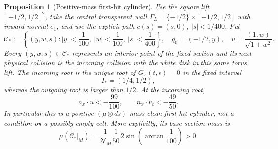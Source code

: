 \documentclass[11pt]{article}
\newtheorem{proposition}[theorem]{Proposition}
\begin{document}
\begin{proposition}[Positive-mass first-hit cylinder]
\label{prop:fixed-section-positive-first-hit-cylinder}
Use the square lift $[-1/2,1/2]^2$, take the central transparent wall
$\Gamma_L=\{-1/2\}\times[-1/2,1/2]$ with inward normal $e_1$, and use the
explicit path $c(s)=(s,0)$, $|s|<1/400$.  Put
\begin{equation}
\label{eq:fixed-section-explicit-cylinder}
 \mathcal C_*:=\left\{(y,w,s):
 |y|<\frac1{100},\ |w|<\frac1{100},\ |s|<\frac1{400}\right\},
 \quad
 q_0=(-1/2,y),\quad
 u=\frac{(1,w)}{\sqrt{1+w^2}}.
\end{equation}
Every $(y,w,s)\in\mathcal C_*$ represents an interior point of the fixed
section and its next physical collision is the incoming collision with the
white disk in this same torus lift.  The incoming root is the unique root of
$G_x(t,s)=0$ in the fixed interval
\begin{equation}
 I_*=(1/4,1/2),
\label{eq:fixed-section-first-hit-interval}
\end{equation}
whereas the outgoing root is larger than $1/2$.  At the incoming root,
\begin{equation}
 n_x\cdot u<-\frac{99}{100},
 \qquad
 n_x\cdot v_c<-\frac{49}{50}.
\label{eq:fixed-section-cylinder-transversality}
\end{equation}
In particular this is a positive-$(\mu\otimes ds)$-mass clean first-hit
cylinder, not a condition on a possibly empty cell.  More explicitly, its
base-section mass is
\begin{equation}
 \mu(\mathcal C_*|_M)
 =\frac1{\mathcal N_M}\frac1{50}\,
   2\sin\!\left(\arctan\frac1{100}\right)>0.
\label{eq:fixed-section-cylinder-positive-mass}
\end{equation}
\end{proposition}
\end{document}
